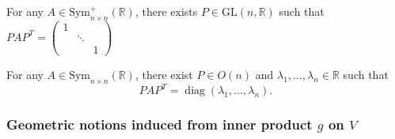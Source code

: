 \begin{theorem}
    For any $A\in\text{Sym}_{n\times n}^+(\mathbb{R})$, there exists $P\in\text{GL}(n,\mathbb{R})$ such that $PAP^T=\begin{pmatrix}
            1 &        &   \\
              & \ddots &   \\
              &        & 1
        \end{pmatrix}$ 

\end{theorem}

\begin{theorem}
    For any $A\in\text{Sym}_{n\times n}(\mathbb{R})$, there exist $P\in O(n)$ and $\lambda_1,\dots,\lambda_n\in\mathbb{R}$ such that
    $$PAP^T=\operatorname{diag}\left(\lambda_1,\dots,\lambda_n\right).$$
\end{theorem}

\subsubsection{Geometric notions induced from inner product $g$ on $V$}

